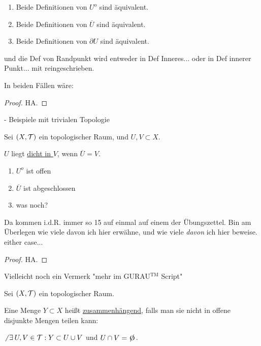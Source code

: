 \begin{lemma}
    \begin{enumerate}
        \item Beide Definitionen von $U^o$ sind äquivalent.
        \item Beide Definitionen von $\overline{U}$ sind äquivalent.
        \item Beide Definitionen von $\partial U$ sind äquivalent.
    \end{enumerate}
    und die Def von Randpunkt wird entweder in Def Inneres... oder in Def innerer Punkt... mit reingeschrieben.
\end{lemma}

In beiden Fällen wäre:

\begin{proof}
    HA.
\end{proof}

- Beispiele mit trivialen Topologie

\begin{definition}[dicht]
    Sei $(X, \mathcal{T})$ ein topologischer Raum, und $U, V \subset X$.

    $U$ liegt \underline{dicht in $V$}, wenn $\overline{U} = V$.
\end{definition}

\begin{lemma}
    \begin{enumerate}
        \item $U^o$ ist offen
        \item $\overline{U}$ ist abgeschlossen
        \item was noch?
    \end{enumerate}
    Da kommen i.d.R. immer so 15 auf einmal auf einem der Übungszettel. Bin am Überlegen wie viele davon ich hier erwähne, und wie viele \emph{davon} ich hier beweise. either case...
\end{lemma}
\begin{proof}
    HA.
\end{proof}

Vielleicht noch ein Vermerk "mehr im GURAU$^{\text{TM}}$ Script"

\begin{definition}[zusammenhängend]
    Sei $(X, \mathcal{T})$ ein topologischer Raum.
    
    Eine Menge $Y \subset X$ heißt \underline{zusammenhängend}, falls man sie nicht in offene disjunkte Mengen teilen kann:
    
    $\not\exists U, V \in \T: Y \subset U \cup V$ und $U \cap V = \e$.
\end{definition}

